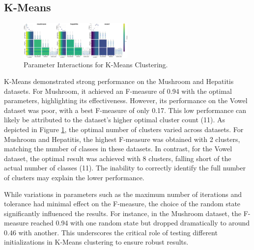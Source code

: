 \subsection{K-Means}
\label{subsec:kmeansresults}

\begin{figure}[ht!]
    \centering \includegraphics[width=0.5\textwidth]{figures/interactions_kmeans.png}
    \caption{Parameter Interactions for K-Means Clustering.}
    \label{fig:interactions-kmeans}
\end{figure}

K-Means demonstrated strong performance on the Mushroom and Hepatitis datasets. For Mushroom, it achieved an F-measure of 0.94 with the optimal parameters, highlighting its effectiveness. However, its performance on the Vowel dataset was poor, with a best F-measure of only 0.17. This low performance can likely be attributed to the dataset's higher optimal cluster count (11). As depicted in Figure \ref{fig:interactions-kmeans}, the optimal number of clusters varied across datasets. For Mushroom and Hepatitis, the highest F-measure was obtained with 2 clusters, matching the number of classes in these datasets. In contrast, for the Vowel dataset, the optimal result was achieved with 8 clusters, falling short of the actual number of classes (11). The inability to correctly identify the full number of clusters may explain the lower performance.

While variations in parameters such as the maximum number of iterations and tolerance had minimal effect on the F-measure, the choice of the random state significantly influenced the results. For instance, in the Mushroom dataset, the F-measure reached 0.94 with one random state but dropped dramatically to around 0.46 with another. This underscores the critical role of testing different initializations in K-Means clustering to ensure robust results.
